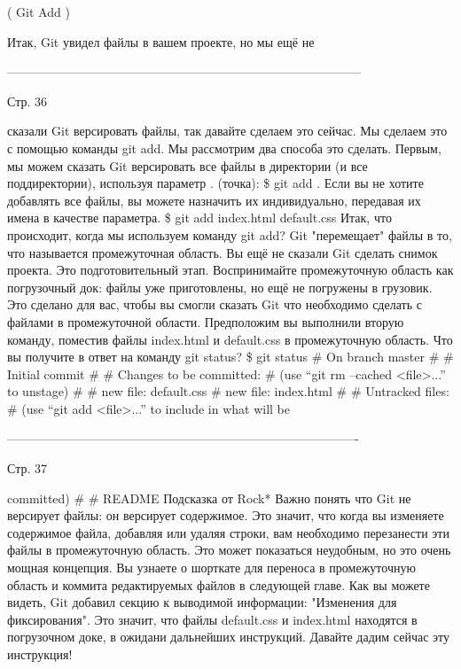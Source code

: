( Git Add )

Итак, Git увидел файлы в вашем проекте, но мы ещё не

--------------------------------------------------------------------------------------

Стр. 36

сказали Git версировать файлы, так давайте сделаем это сейчас. Мы сделаем это с помощью
команды git add.
Мы рассмотрим два способа это сделать. Первым, мы можем сказать Git версировать все 
файлы в директории (и все поддиректории), используя параметр . (точка):
\$ git add .
Если вы не хотите добавлять все файлы, вы можете назначить их индивидуально, передавая
их имена в качестве параметра.
\$ git add index.html default.css
Итак, что происходит, когда мы используем команду git add? Git "перемещает" файлы в то,
что называется промежуточная область. Вы ещё не сказали Git сделать снимок проекта. Это
подготовительный этап. Воспринимайте промежуточную область как погрузочный док: файлы уже
приготовлены, но ещё не погружены в грузовик. Это сделано для вас, чтобы вы смогли сказать
Git что необходимо сделать с файлами в промежуточной области. Предположим вы выполнили
вторую команду, поместив файлы index.html и default.css в промежуточную область. Что вы
получите в ответ на команду git status?
\$ git status
# On branch master
#
# Initial commit
#
# Changes to be committed:
#
(use “git rm --cached <file>...” to unstage)
#
#    new file: default.css
#    new file: index.html
#
# Untracked files:
#
(use “git add <file>...” to include in what will be

-------------------------------------------------------------------------------------

Стр. 37

committed)
#
#   
README
        Подсказка от Rock*
        Важно понять что Git не версирует файлы: он версирует содержимое. Это значит,
        что когда вы изменяете содержимое файла, добавляя или удаляя строки, вам 
        необходимо перезанести эти файлы в промежуточную область. Это может показаться
        неудобным, но это очень мощная концепция. Вы узнаете о шорткате для переноса в 
        промежуточную область и коммита редактируемых файлов в следующей главе.
Как вы можете видеть, Git добавил секцию к выводимой информации: "Изменения для 
фиксирования". Это значит, что файлы default.css и index.html находятся в погрузочном
доке, в ожидани дальнейших инструкций. Давайте дадим сейчас эту инструкция!